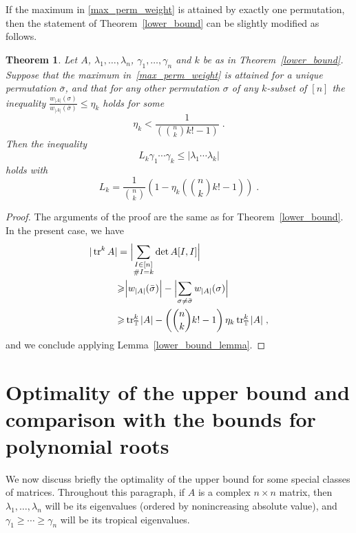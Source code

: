 \documentclass[a4paper]{amsart}
\theoremstyle{definition}
\theoremstyle{plain}
\newtheorem{thm}{Theorem}
\theoremstyle{remark}
\begin{document}
If the maximum in \eqref{max_perm_weight} is attained by exactly one permutation,
then the statement of Theorem~\ref{lower_bound} can be slightly modified as follows.
\begin{thm}
Let $A$, $\lambda_1,\dots,\lambda_n$, $\gamma_1,\dots,\gamma_n$ and $k$ be as 
in Theorem~\ref{lower_bound}.
 Suppose that the maximum in~\eqref{max_perm_weight} is attained for a unique
 permutation $\bar{\sigma}$, and that for any other permutation $\sigma$ of
 any $k$-subset of 
$[n]$
the inequality
 $\frac{w_{|A|}(\sigma)}{w_{|A|}(\bar{\sigma})} {\leqslant} \eta_k$
 holds for some 
 \[ \eta_k < \frac{1}{\left(\binom{n}{k} k! - 1 \right)} \; . \]
 Then the inequality
 \[ L_k\gamma_1\dotsm\gamma_k{\leqslant}|\lambda_1\dotsm\lambda_k| \]
 holds with
 \[ L_k = \frac{1}{\binom{n}{k}}\left(1 -\eta_k \left(\binom{n}{k} k! - 1 \right) \right) \; . \]
\end{thm}

\begin{proof}
The arguments of the proof are the same as for Theorem~\ref{lower_bound}.
In the present case, we have
\[
\begin{aligned}
|\operatorname{tr}^k A| &= \Bigl|\sum_{\substack{I\in[n]\\{\# {I}}=k}}\det A[I,I]\Bigr|\\
&{\geqslant} \Bigl|w_{|A|}(\bar{\sigma})\Bigr|-\Bigl|\sum_{\sigma\neq\bar{\sigma}} w_{|A|}(\sigma)\Bigr|\\
&{\geqslant} \operatorname{tr}^k_{{\mathbb{T}}} |A| - \left( \binom{n}{k} k! - 1 \right) \eta_k \operatorname{tr}^k_{{\mathbb{T}}} |A| \; ,
\end{aligned}
\]
and we conclude applying Lemma~\ref{lower_bound_lemma}.
\end{proof}

\section{Optimality of the upper bound and comparison with the bounds for polynomial roots}\label{sec-compar}
We now discuss briefly the optimality of the upper bound for some special classes of matrices. 
Throughout this paragraph, if $A$ is a complex $n \times n$ matrix, then 
$\lambda_1, \dots, \lambda_n$ will be its eigenvalues (ordered by nonincreasing absolute value),
and $\gamma_1 {\geqslant} \cdots {\geqslant} \gamma_n$ will be its tropical eigenvalues.
\end{document}
